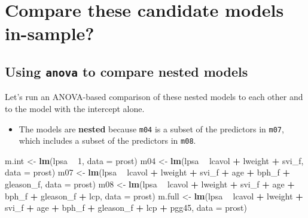 \documentclass[]{book}
\newenvironment{Shaded}{\begin{snugshade}}{\end{snugshade}}
\newcommand{\KeywordTok}[1]{\textcolor[rgb]{0.13,0.29,0.53}{\textbf{#1}}}
\newcommand{\DataTypeTok}[1]{\textcolor[rgb]{0.13,0.29,0.53}{#1}}
\newcommand{\DecValTok}[1]{\textcolor[rgb]{0.00,0.00,0.81}{#1}}
\newcommand{\StringTok}[1]{\textcolor[rgb]{0.31,0.60,0.02}{#1}}
\newcommand{\OperatorTok}[1]{\textcolor[rgb]{0.81,0.36,0.00}{\textbf{#1}}}
\newcommand{\NormalTok}[1]{#1}
\providecommand{\tightlist}{%
  \setlength{\itemsep}{0pt}\setlength{\parskip}{0pt}}
\theoremstyle{definition}
\theoremstyle{definition}
\theoremstyle{definition}
\theoremstyle{remark}
\begin{document}
\section{Compare these candidate models
in-sample?}\label{compare-these-candidate-models-in-sample}

\subsection{\texorpdfstring{Using \texttt{anova} to compare nested
models}{Using anova to compare nested models}}\label{using-anova-to-compare-nested-models}

Let's run an ANOVA-based comparison of these nested models to each other
and to the model with the intercept alone.

\begin{itemize}
\tightlist
\item
  The models are \textbf{nested} because \texttt{m04} is a subset of the
  predictors in \texttt{m07}, which includes a subset of the predictors
  in \texttt{m08}.
\end{itemize}

\begin{Shaded}
\begin{Highlighting}[]
\NormalTok{m.int <-}\StringTok{ }\KeywordTok{lm}\NormalTok{(lpsa }\OperatorTok{~}\StringTok{ }\DecValTok{1}\NormalTok{, }\DataTypeTok{data =}\NormalTok{ prost)}
\NormalTok{m04 <-}\StringTok{ }\KeywordTok{lm}\NormalTok{(lpsa }\OperatorTok{~}\StringTok{ }\NormalTok{lcavol }\OperatorTok{+}\StringTok{ }\NormalTok{lweight }\OperatorTok{+}\StringTok{ }\NormalTok{svi_f, }\DataTypeTok{data =}\NormalTok{ prost)}
\NormalTok{m07 <-}\StringTok{ }\KeywordTok{lm}\NormalTok{(lpsa }\OperatorTok{~}\StringTok{ }\NormalTok{lcavol }\OperatorTok{+}\StringTok{ }\NormalTok{lweight }\OperatorTok{+}\StringTok{ }\NormalTok{svi_f }\OperatorTok{+}\StringTok{ }
\StringTok{              }\NormalTok{age }\OperatorTok{+}\StringTok{ }\NormalTok{bph_f }\OperatorTok{+}\StringTok{ }\NormalTok{gleason_f, }\DataTypeTok{data =}\NormalTok{ prost)}
\NormalTok{m08 <-}\StringTok{ }\KeywordTok{lm}\NormalTok{(lpsa }\OperatorTok{~}\StringTok{ }\NormalTok{lcavol }\OperatorTok{+}\StringTok{ }\NormalTok{lweight }\OperatorTok{+}\StringTok{ }\NormalTok{svi_f }\OperatorTok{+}\StringTok{ }
\StringTok{              }\NormalTok{age }\OperatorTok{+}\StringTok{ }\NormalTok{bph_f }\OperatorTok{+}\StringTok{ }\NormalTok{gleason_f }\OperatorTok{+}\StringTok{ }\NormalTok{lcp, }\DataTypeTok{data =}\NormalTok{ prost)}
\NormalTok{m.full <-}\StringTok{ }\KeywordTok{lm}\NormalTok{(lpsa }\OperatorTok{~}\StringTok{ }\NormalTok{lcavol }\OperatorTok{+}\StringTok{ }\NormalTok{lweight }\OperatorTok{+}\StringTok{ }\NormalTok{svi_f }\OperatorTok{+}\StringTok{ }
\StringTok{              }\NormalTok{age }\OperatorTok{+}\StringTok{ }\NormalTok{bph_f }\OperatorTok{+}\StringTok{ }\NormalTok{gleason_f }\OperatorTok{+}\StringTok{ }\NormalTok{lcp }\OperatorTok{+}\StringTok{ }\NormalTok{pgg45, }\DataTypeTok{data =}\NormalTok{ prost)}
\end{Highlighting}
\end{Shaded}
\end{document}
